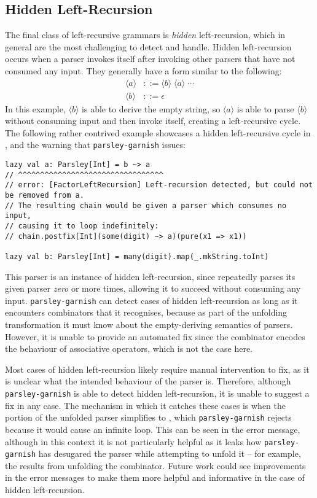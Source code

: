 \documentclass[../../main.tex]{subfiles}
\begin{document}
\subsection{Hidden Left-Recursion}
The final class of left-recursive grammars is \emph{hidden} left-recursion, which in general are the most challenging to detect and handle.
Hidden left-recursion occurs when a parser invokes itself after invoking other parsers that have not consumed any input.
They generally have a form similar to the following:
\begin{align*}
\langle \mathit{a} \rangle &::= \langle \mathit{b} \rangle \; \langle \mathit{a} \rangle \; \dotsb \\
\langle \mathit{b} \rangle &::= \epsilon
\end{align*}
%
In this example, $\langle \mathit{b} \rangle$ is able to derive the empty string, so $\langle \mathit{a} \rangle$ is able to parse $\langle \mathit{b} \rangle$ without consuming input and then invoke itself, creating a left-recursive cycle.
The following rather contrived example showcases a hidden left-recursive cycle in , and the warning that \texttt{parsley-garnish} issues:
\begin{verbatim}
lazy val a: Parsley[Int] = b ~> a
// ^^^^^^^^^^^^^^^^^^^^^^^^^^^^^^^^^
// error: [FactorLeftRecursion] Left-recursion detected, but could not be removed from a.
// The resulting chain would be given a parser which consumes no input,
// causing it to loop indefinitely:
// chain.postfix[Int](some(digit) ~> a)(pure(x1 => x1))

lazy val b: Parsley[Int] = many(digit).map(_.mkString.toInt)
\end{verbatim}
%
This parser is an instance of hidden left-recursion, since  repeatedly parses its given parser \emph{zero} or more times, allowing it to succeed without consuming any input. 
\texttt{parsley-garnish} can detect cases of hidden left-recursion as long as it encounters combinators that it recognises, because as part of the unfolding transformation it must know about the empty-deriving semantics of parsers.
However, it is unable to provide an automated fix since the  combinator encodes the behaviour of associative operators, which is not the case here.

Most cases of hidden left-recursion likely require manual intervention to fix, as it is unclear what the intended behaviour of the parser is.
Therefore, although \texttt{parsley-garnish} is able to detect hidden left-recursion, it is unable to suggest a fix in any case.
The mechanism in which it catches these cases is when the  portion of the unfolded parser simplifies to , which \texttt{parsley-garnish} rejects because it would cause an infinite loop.
This can be seen in the error message, although in this context it is not particularly helpful as it leaks how \texttt{parsley-garnish} has desugared the parser while attempting to unfold it -- for example, the  results from unfolding the  combinator.
Future work could see improvements in the error messages to make them more helpful and informative in the case of hidden left-recursion.
\end{document}
